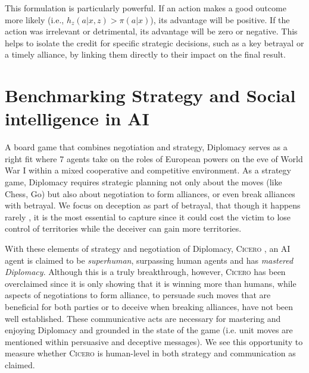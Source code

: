 \documentclass[oneside]{memoir}
\newcommand{\cicero}{\abr{Cicero} }
\newcommand{\abr}[1]{\textsc{#1}}
\begin{document}
This formulation is particularly powerful. If an action makes a good outcome more likely (i.e., $h_z(a|x, z) > \pi(a|x)$), its advantage will be positive. If the action was irrelevant or detrimental, its advantage will be zero or negative. This helps to isolate the credit for specific strategic decisions, such as a key betrayal or a timely alliance, by linking them directly to their impact on the final result.


%
%




%
%

\chapter{Benchmarking Strategy and Social intelligence in AI}
\label{ch:benchmark_cicero}
A board game that combines negotiation and strategy, Diplomacy serves as a right fit where 7 agents take on the roles of European powers on the eve of World War I within a mixed cooperative and competitive environment. As a strategy game, Diplomacy requires strategic planning not only about the moves (like Chess, Go) but also about negotiation to form alliances, or even break alliances with betrayal. We focus on deception as part of betrayal, that though it happens rarely \citep[5\%,][]{peskov2020takes}, it is the most essential to capture since it could cost the victim to lose control of territories while the deceiver can gain more territories.

With these elements of strategy and negotiation of Diplomacy, \cicero, an AI agent is claimed to be \textit{superhuman}, surpassing human agents and has \textit{mastered Diplomacy}. Although this is a truly breakthrough, however, \cicero has been overclaimed since it is only showing that it is winning more than humans, while aspects of negotiations to form alliance, to persuade such moves that are beneficial for both parties or to deceive when breaking alliances, have not been well established. These communicative acts are necessary for mastering and enjoying Diplomacy and grounded in the state of the game (i.e. unit moves are mentioned within persuasive and deceptive messages). We see this opportunity to measure whether \cicero is human-level in both strategy and communication as claimed.
\end{document}

